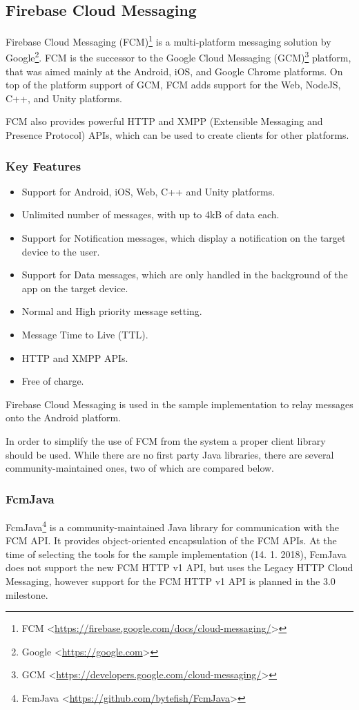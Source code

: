 \subsection{Firebase Cloud Messaging}
Firebase Cloud Messaging (FCM)\footnote{FCM <\url{https://firebase.google.com/docs/cloud-messaging/}>} is a multi-platform messaging solution by Google\footnote{Google <\url{https://google.com}>}. FCM is the successor to the Google Cloud Messaging (GCM)\footnote{GCM <\url{https://developers.google.com/cloud-messaging/}>} platform, that was aimed mainly at the Android, iOS, and Google Chrome platforms. On top of the platform support of GCM, FCM adds support for the Web, NodeJS, C++, and Unity platforms. 

FCM also provides powerful HTTP and XMPP (Extensible Messaging and Presence Protocol) APIs, which can be used to create clients for other platforms.

\subsubsection*{Key Features\cite{fcm}}
\begin{itemize}
\item Support for Android, iOS, Web, C++ and Unity platforms.
\item Unlimited number of messages, with up to 4kB of data each.
\item Support for Notification messages, which display a notification on the target device to the user.
\item Support for Data messages, which are only handled in the background of the app on the target device.
\item Normal and High priority message setting.
\item Message Time to Live (TTL).
\item HTTP and XMPP APIs.
\item Free of charge.
\end{itemize}

Firebase Cloud Messaging is used in the sample implementation to relay messages onto the Android platform.

In order to simplify the use of FCM from the system a proper client library should be used. While there are no first party Java libraries, there are several community-maintained ones, two of which are compared below.

\subsubsection{FcmJava}
FcmJava\footnote{FcmJava <\url{https://github.com/bytefish/FcmJava}>} is a community-maintained Java library for communication with the FCM API. It provides object-oriented encapsulation of the FCM APIs. At the time of selecting the tools for the sample implementation (14. 1. 2018), FcmJava does not support the new FCM HTTP v1 API, but uses the Legacy HTTP Cloud Messaging, however support for the FCM HTTP v1 API is planned in the 3.0 milestone\cite{fcmJava}.

